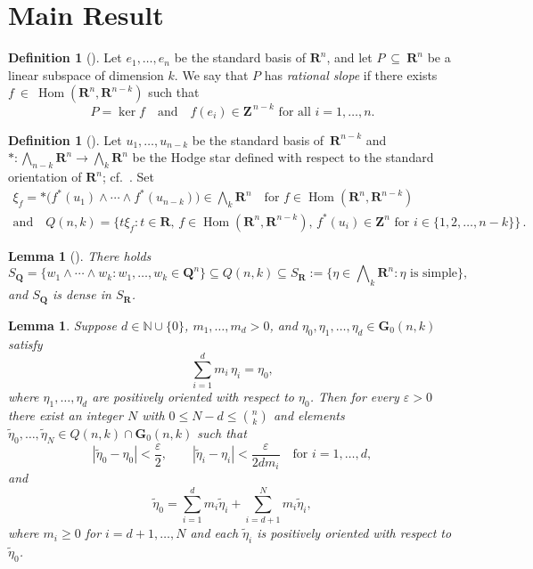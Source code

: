 \documentclass[a4paper,twoside,reqno]{article}
\theoremstyle{definition}
\theoremstyle{remark}
\theoremstyle{plain}
\newtheorem{lemma}[theorem]{Lemma}
\theoremstyle{remark}
\theoremstyle{definition}
\newtheorem{definition}[theorem]{Definition}
\newcommand{\ograss}[2]{\mathbf{G}_0(#1,#2)}
\newcommand{\natp}{\mathbb{N}}
\newcommand{\nat}{\natp \cup \{0\}}
\newcommand{\integers}{\mathbf{Z}}
\newcommand{\Z}{\integers}
\newcommand{\R}{\mathbf{R}}
\newcommand{\Q}{\mathbf{Q}}
\newcommand{\tbwedge}{{\textstyle \boldsymbol{\bigwedge}}}
\DeclareMathOperator{\Hom}{Hom}
\begin{document}
\section{Main Result}\label{section:main_result}

\begin{definition}[]
    Let $e_1,\ldots,e_n$ be the standard basis of $\R^n$, and let 
    $P~\subseteq~\R^n$ be a linear subspace of dimension $k$. We say that $P$ 
    has \emph{rational slope} if there exists $f~\in~\Hom(\R^n,\R^{n-k})$ such 
    that 
    \[
        P = \ker f \quad \text{and} \quad f(e_i) \in \Z^{\,n-k} \text{ for all } i = 1,\ldots,n.
    \]
\end{definition}

\begin{definition}[]
    Let $u_1,\ldots,u_{n-k}$ be the standard basis of~$\R^{n-k}$ and
    $\ast : \tbwedge_{n-k} \R^n \to \tbwedge_k \R^n$ be the Hodge star defined with
    respect to the standard orientation of $\R^n$; cf.~\cite[1.7.8]{Federer1969}.
    Set
    \begin{gather}
        \xi_{f} = \ast \bigl( f^*(u_1) \wedge \cdots \wedge f^*(u_{n-k}) \bigr)
        \in \tbwedge_k \R^n
        \quad \text{for $f \in \Hom(\R^n,\R^{n-k})$} 
        \\
        \text{and} \quad
        Q(n,k) = \bigl\{ t \xi_f :
        t \in \R ,\,
        f \in \Hom(\R^n,\R^{n-k}) ,\, f^*(u_i) \in \integers^{n}
        \text{ for } i \in \{ 1,2,\ldots,n-k \}
        \bigr\} \,.
    \end{gather}
\end{definition}

\begin{lemma}[]\label{lem:SQ_dense}
    There holds
    \[
        S_{\Q} = \bigl\{ w_1 \wedge \cdots \wedge w_k : w_1,\ldots,w_k \in \Q^n \bigr\}
        \subseteq Q(n,k)
        \subseteq S_{\R} 
        := \bigl\{ \eta \in \tbwedge_k \R^n : \eta \text{ is simple} \bigr\},
    \]
    and $S_{\Q}$ is dense in $S_{\R}$.
\end{lemma}

\begin{lemma}\label{lemma:approximate}
    Suppose $d\in\nat$, $m_1,\dots,m_d>0$, and
    $\eta_0,\eta_1,\dots,\eta_d\in\ograss nk$ satisfy
    \[
        \sum_{i=1}^d m_i\,\eta_i=\eta_0,
    \]
    where $\eta_1,\dots,\eta_d$ are positively oriented with respect to $\eta_0$.
    Then for every $\varepsilon>0$ there exist an integer
    $N$ with $0\le N-d\le\binom{n}{k}$ and elements
    $\tilde\eta_0,\dots,\tilde\eta_N\in Q(n,k)\cap\ograss nk$ such that
    \[
        |\tilde\eta_0-\eta_0|<\frac{\varepsilon}{2},
        \qquad
        |\tilde\eta_i-\eta_i|<\frac{\varepsilon}{2dm_i}
        \quad\text{for }i=1,\dots,d,
    \]
    and
    \[
        \tilde\eta_0=\sum_{i=1}^d m_i\tilde\eta_i+\sum_{i=d+1}^N m_i\tilde\eta_i,
    \]
    where $m_i\ge0$ for $i=d+1,\dots,N$ and each $\tilde\eta_i$ is positively
    oriented with respect to $\tilde\eta_0$.
\end{lemma}
\end{document}
